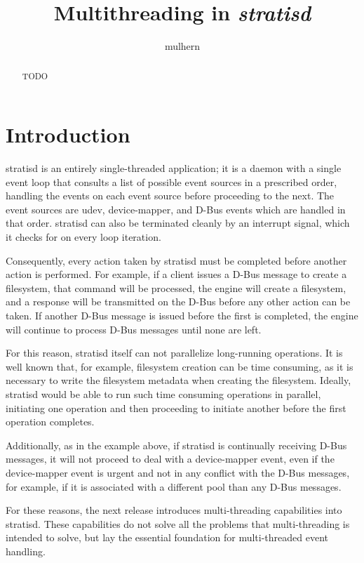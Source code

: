 \documentclass[]{article}
\title{Multithreading in \emph{stratisd}}
\author{mulhern}
\begin{document}
\maketitle

\begin{abstract}
TODO
\end{abstract}

\section{Introduction}
stratisd is an entirely single-threaded application; it is a daemon with a single event loop that consults a list of possible event sources in a prescribed order, handling the events on each event source before proceeding to the next. The event sources are udev, device-mapper, and D-Bus events which are handled in that order. stratisd can also be terminated cleanly by an interrupt signal, which it checks for on every loop iteration.

Consequently, every action taken by stratisd must be completed before another action is performed. For example, if a client issues a D-Bus message to create a filesystem, that command will be processed, the engine will create a filesystem, and a response will be transmitted on the D-Bus before any other action can be taken. If another D-Bus message is issued before the first is completed, the engine will continue to process D-Bus messages until none are left.

For this reason, stratisd itself can not parallelize long-running operations. It is well known that, for example, filesystem creation can be time consuming, as it is necessary to write the filesystem metadata when creating the filesystem. Ideally, stratisd would be able to run such time consuming operations in parallel, initiating one operation and then proceeding to initiate another before the first operation completes.

Additionally, as in the example above, if stratisd is continually receiving D-Bus messages, it will not proceed to deal with a device-mapper event, even if the device-mapper event is urgent and not in any conflict with the D-Bus messages, for example, if it is associated with a different pool than any D-Bus messages.

For these reasons, the next release introduces multi-threading capabilities into stratisd. These capabilities do not solve all the problems that multi-threading is intended to solve, but lay the essential foundation for multi-threaded event handling.
\end{document}
